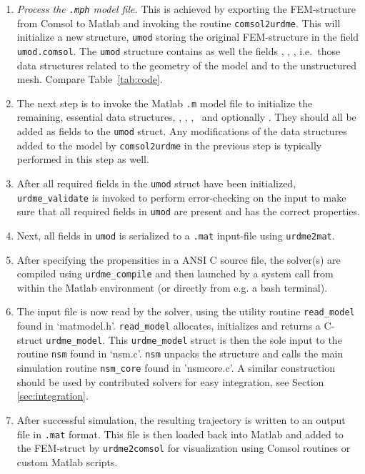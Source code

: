 \begin{enumerate}
\item \emph{Process the \texttt{.mph} model file.}  This is achieved
  by exporting the FEM-structure from Comsol to Matlab and invoking
  the routine \texttt{comsol2urdme}. This will initialize a new structure,
  \texttt{umod} storing the original FEM-structure in the field \texttt{umod.comsol}. The
  \texttt{umod} structure contains as well the fields \varD, \varvol, \varsd, i.e.~those
  data structures related to the geometry of the model and to the
  unstructured mesh. Compare Table~\ref{tab:code}.

\item The next step is to invoke the Matlab \texttt{.m} model file to
  initialize the remaining, essential data structures, \varN, \varG,
  \varu, \vartspan\ and optionally \vardata. They should all be added
  as fields to the \texttt{umod} struct. Any modifications of the
  data structures added to the model by \texttt{comsol2urdme} in the
  previous step is typically performed in this step as well.

\item After all required fields in the \texttt{umod} struct have
  been initialized, \texttt{urdme\_validate} is invoked to perform
  error-checking on the input to make sure that all required fields in
  \texttt{umod} are present and has the correct properties.
 
\item Next, all fields in \texttt{umod} is serialized to a
  \texttt{.mat} input-file using \texttt{urdme2mat}.

\item After specifying the propensities in a ANSI C source file, the
  solver(s) are compiled using \texttt{urdme\_compile} and then
  launched by a system call from within the Matlab environment (or
  directly from e.g. a bash terminal).

\item The input file is now read by the solver, using the utility
  routine \texttt{read\_model} found in
  `matmodel.h'. \texttt{read\_model} allocates, initializes and
  returns a C-struct \texttt{urdme\_model}. This \texttt{urdme\_model}
  struct is then the sole input to the routine \texttt{nsm} found in
  `nsm.c'. \texttt{nsm} unpacks the structure and calls the main
  simulation routine \texttt{nsm\_core} found in 'nsmcore.c'. A
  similar construction should be used by contributed solvers for easy
  integration, see Section \ref{sec:integration}.

\item After successful simulation, the resulting trajectory is written
  to an output file in \texttt{.mat} format. This file is then loaded
  back into Matlab and added to the FEM-struct by
  \texttt{urdme2comsol} for visualization using Comsol routines or
  custom Matlab scripts.
\end{enumerate} 

